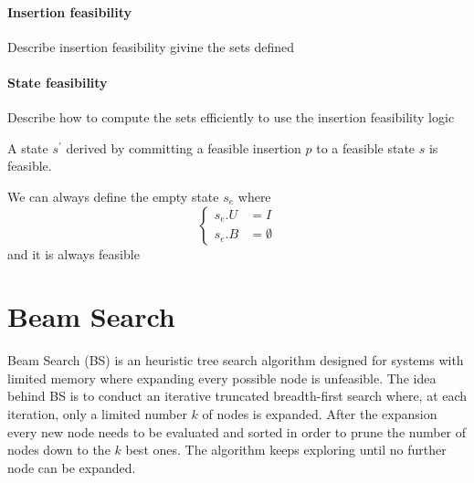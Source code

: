 

\paragraph*{Insertion feasibility}
Describe insertion feasibility givine the sets defined\\


\paragraph*{State feasibility}
Describe how to compute the sets efficiently to use the insertion feasibility logic\\


\begin{proposition}
    \label{prop:feasible_expansion}
    A state $s^\prime$ derived by committing a feasible insertion $p$ to a feasible state $s$ is feasible.
\end{proposition}

\begin{observation}
    \label{def:empty_state}
    We can always define the empty state $s_e$ where \begin{equation*}
        \left\{ 
            \begin{aligned}
            s_e.U & = I \\
            s_e.B & = \emptyset
            \end{aligned}
        \right.
    \end{equation*}
    and it is always feasible
\end{observation}

\section{Beam Search}
\label{sec:beamsearch}%
Beam Search (BS) %
is an heuristic tree search algorithm designed for systems with limited memory where expanding every possible node is unfeasible.
The idea behind BS is to conduct an iterative truncated breadth-first search where, at each iteration, only a limited number $k$ of nodes is expanded.
After the expansion every new node needs to be evaluated and sorted in order to prune the number of nodes down to the $k$ best ones. The algorithm keeps exploring until no further node can be expanded.

